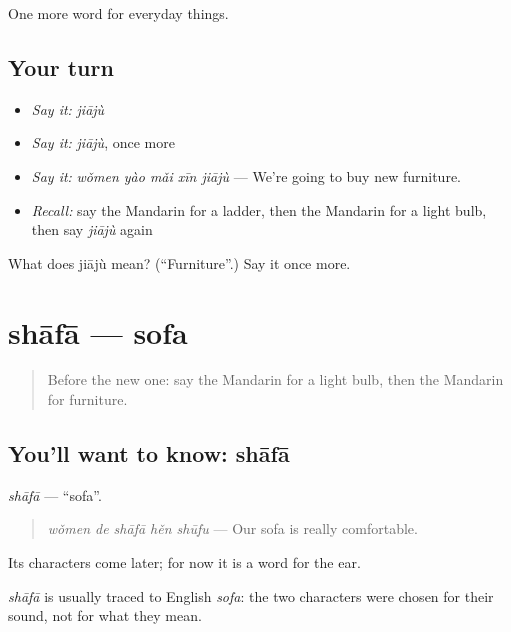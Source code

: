 \begin{grammarlens}[title={What you've built}]
One more word for everyday things.
\end{grammarlens}

\subsection*{Your turn}
\begin{itemize}
\raggedright
  \item \emph{Say it:} \emph{jiājù}
  \item \emph{Say it:} \emph{jiājù}, once more
  \item \emph{Say it:} \emph{wǒmen yào mǎi xīn jiājù} — We're going to buy new furniture.
  \item \emph{Recall:} say the Mandarin for a ladder, then the Mandarin for a light bulb, then say \emph{jiājù} again
\end{itemize}

\begin{tcolorbox}[breakable,colback=teal!4,colframe=teal!35!black,title={Before you move on}]
What does jiājù mean? (\textquotedblleft{}Furniture\textquotedblright{}.) Say it once more.
\end{tcolorbox}
\section[shāfā]{shāfā — sofa}

\label{lesson:ZH-C175-shafa}



\begin{quote}
Before the new one: say the Mandarin for a light bulb, then the Mandarin for furniture.
\end{quote}

\subsection*{You'll want to know: shāfā}
\emph{shāfā} — \textquotedblleft{}sofa\textquotedblright{}.

\begin{quote}
\emph{wǒmen de shāfā hěn shūfu} — Our sofa is really comfortable.
\end{quote}

Its characters come later; for now it is a word for the ear.

\begin{cousinweb}
\emph{shāfā} is usually traced to English \emph{sofa}: the two characters were chosen for their sound, not for what they mean.
\end{cousinweb}

